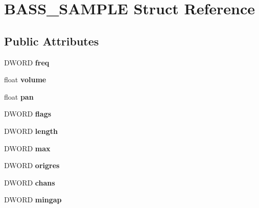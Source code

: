 \hypertarget{structBASS__SAMPLE}{}\section{B\+A\+S\+S\+\_\+\+S\+A\+M\+P\+L\+E Struct Reference}
\label{structBASS__SAMPLE}
\subsection*{Public Attributes}
\begin{DoxyCompactItemize}
\item 
\hypertarget{structBASS__SAMPLE_acabd72a2635853202082a5ad0c9529e7}{}D\+W\+O\+R\+D {\bfseries freq}\label{structBASS__SAMPLE_acabd72a2635853202082a5ad0c9529e7}

\item 
\hypertarget{structBASS__SAMPLE_a44fc378a594c2eabb25fb54b0809d632}{}float {\bfseries volume}\label{structBASS__SAMPLE_a44fc378a594c2eabb25fb54b0809d632}

\item 
\hypertarget{structBASS__SAMPLE_aae9f6113048ac8c46c1b4b8de3d3e032}{}float {\bfseries pan}\label{structBASS__SAMPLE_aae9f6113048ac8c46c1b4b8de3d3e032}

\item 
\hypertarget{structBASS__SAMPLE_ae2863c9c7e8f3e40805cfb81759e9e51}{}D\+W\+O\+R\+D {\bfseries flags}\label{structBASS__SAMPLE_ae2863c9c7e8f3e40805cfb81759e9e51}

\item 
\hypertarget{structBASS__SAMPLE_afee703fb2be34e5ea6cd2d9a9e8ddff0}{}D\+W\+O\+R\+D {\bfseries length}\label{structBASS__SAMPLE_afee703fb2be34e5ea6cd2d9a9e8ddff0}

\item 
\hypertarget{structBASS__SAMPLE_a42ecc61ca6008579bc2fcb4fb1bc19fe}{}D\+W\+O\+R\+D {\bfseries max}\label{structBASS__SAMPLE_a42ecc61ca6008579bc2fcb4fb1bc19fe}

\item 
\hypertarget{structBASS__SAMPLE_a9f0c4c3caeab28316ead100cc6d36844}{}D\+W\+O\+R\+D {\bfseries origres}\label{structBASS__SAMPLE_a9f0c4c3caeab28316ead100cc6d36844}

\item 
\hypertarget{structBASS__SAMPLE_a0f7dc81cf0753dbe14848d61544e7f51}{}D\+W\+O\+R\+D {\bfseries chans}\label{structBASS__SAMPLE_a0f7dc81cf0753dbe14848d61544e7f51}

\item 
\hypertarget{structBASS__SAMPLE_a17646b031533f3ecb07ee5318b484f44}{}D\+W\+O\+R\+D {\bfseries mingap}\label{structBASS__SAMPLE_a17646b031533f3ecb07ee5318b484f44}


\end{DoxyCompactItemize}
